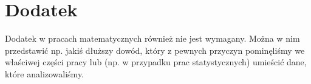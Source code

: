 \documentclass[inzynierska]{pwr_wmat_praca_dyplomowa}
\theoremstyle{plain}
\numberwithin{theorem}{chapter}
\theoremstyle{definition}
\numberwithin{theorem}{chapter}
\begin{document}

{\backmatter \chapter{Dodatek}}
Dodatek w pracach matematycznych również nie jest wymagany. Można w nim przedstawić np. jakiś dłuższy dowód, który z pewnych przyczyn pominęliśmy we właściwej części pracy lub (np. w przypadku prac statystycznych) umieścić dane, które analizowaliśmy.

\newpage
 
\end{document}

